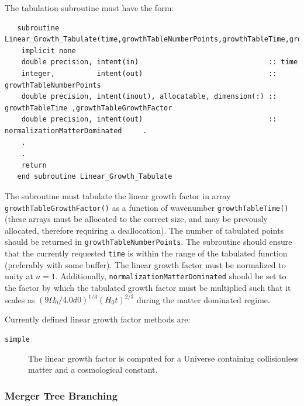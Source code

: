 The tabulation subroutine must have the form:
\begin{verbatim}
   subroutine Linear_Growth_Tabulate(time,growthTableNumberPoints,growthTableTime,growthTableGrowthFactor,normalizationMatterDominated)
    implicit none
    double precision, intent(in)                               :: time
    integer,          intent(out)                              :: growthTableNumberPoints
    double precision, intent(inout), allocatable, dimension(:) :: growthTableTime ,growthTableGrowthFactor
    double precision, intent(out)                              :: normalizationMatterDominated     .
    .
    .
    return
   end subroutine Linear_Growth_Tabulate
\end{verbatim}
The subroutine must tabulate the linear growth factor in array {\tt growthTableGrowthFactor()} as a function of wavenumber {\tt growthTableTime()} (these arrays must be allocated to the correct size, and may be prevously allocated, therefore requiring a deallocation). The number of tabulated points should be returned in {\tt growthTableNumberPoints}. The subroutine should ensure that the currently requested {\tt time} is within the range of the tabulated function (preferably with some buffer). The linear growth factor must be normalized to unity at $a=1$. Additionally, {\tt normalizationMatterDominated} should be set to the factor by which the tabulated growth factor must be multiplied such that it scales as $(9 \Omega_0 / 4.0d0)^{1/3} (H_0 t)^{2/3}$ during the matter dominated regime.

Currently defined linear growth factor methods are:
\begin{description}
 \item [{\tt simple}] The linear growth factor is computed for a Universe containing collisionless matter and a cosmological constant.
\end{description}

\subsubsection{Merger Tree Branching}

